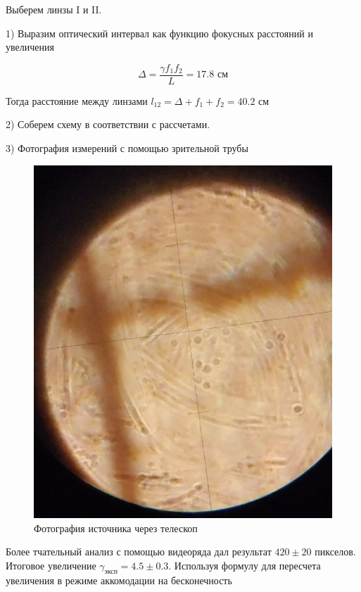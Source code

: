 \documentclass{astroedu-lab}
\begin{document}
\begin{problem}
Выберем линзы I и II.

1) Выразим оптический интервал как функцию фокусных расстояний и увеличения

\begin{equation}
	\Delta = \frac{\gamma f_1 f_2}{L} = 17.8 \text{ см}
\end{equation}

Тогда расстояние между линзами $l_{12} = \Delta + f_1 + f_2 = 40.2 \text{ см}$

2) Соберем схему в соответствии с рассчетами.

3) Фотография измерений с помощью зрительной трубы

\begin{figure}[H]
    \centering
    \includegraphics[scale=0.35]{1.jpg}
    \caption{Фотография источника через телескоп}
\end{figure}

Более тчательный анализ с помощью видеоряда дал результат $420 \pm 20 $ пикселов. Итоговое увеличение $\gamma_\text{эксп} = 4.5 \pm 0.3$. Используя формулу для пересчета увеличения в режиме аккомодации на бесконечность


\end{problem}
\end{document}
